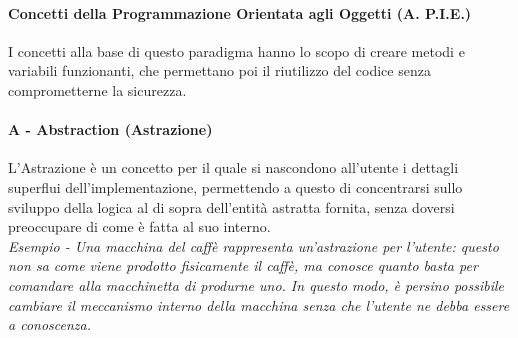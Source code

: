 \documentclass{article}
\begin{document}
            \paragraph{Concetti della Programmazione Orientata agli Oggetti (A. P.I.E.)}
            I concetti alla base di questo paradigma hanno lo scopo di creare metodi e variabili funzionanti, che permettano poi il riutilizzo del codice senza comprometterne la sicurezza.
            
            \paragraph{A - Abstraction (Astrazione)} L'Astrazione è un concetto per il quale si nascondono all'utente i dettagli superflui dell'implementazione, permettendo a questo di concentrarsi sullo sviluppo della logica al di sopra dell'entità astratta fornita, senza doversi preoccupare di come è fatta al suo interno.\\
                \textit{Esempio - Una macchina del caffè rappresenta un'astrazione per l'utente: questo non sa come viene prodotto fisicamente il caffè, ma conosce quanto basta per comandare alla macchinetta di produrne uno. In questo modo, è persino possibile cambiare il meccanismo interno della macchina senza che l'utente ne debba essere a conoscenza.}
            
\end{document}
